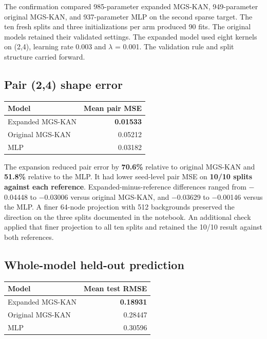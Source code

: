 \documentclass[11pt]{article}
\numberwithin{equation}{section}
\begin{document}
The confirmation compared 985-parameter expanded MGS-KAN, 949-parameter original MGS-KAN, and
937-parameter MLP on the second sparse target. The ten fresh splits and three initializations
per arm produced 90 fits. The original models retained their validated settings. The expanded
model used eight kernels on (2,4), learning rate 0.003 and \ensuremath{\lambda} = 0.001. The
validation rule and split structure carried forward.

\subsection{Pair (2,4) shape error}

\begin{center}
\small
\begin{tabularx}{\linewidth}{@{} Y r @{}}
\toprule
\textbf{Model} & \textbf{Mean pair MSE} \\
\midrule
Expanded MGS-KAN & \textbf{0.01533} \\
Original MGS-KAN & 0.05212 \\
MLP & 0.03182 \\
\bottomrule
\end{tabularx}
\end{center}

The expansion reduced pair error by \textbf{70.6\%} relative to original MGS-KAN and
\textbf{51.8\%} relative to the MLP. It had lower seed-level pair MSE on \textbf{10/10 splits
against each reference}. Expanded-minus-reference differences ranged from
\ensuremath{-}0.04448 to \ensuremath{-}0.03006 versus original MGS-KAN, and
\ensuremath{-}0.03629 to \ensuremath{-}0.00146 versus the MLP. A finer 64-node projection with
512 backgrounds preserved the direction on the three splits documented in the notebook. An
additional check applied that finer projection to all ten splits and retained the 10/10 result
against both references.

\subsection{Whole-model held-out prediction}

\begin{center}
\small
\begin{tabularx}{\linewidth}{@{} Y r @{}}
\toprule
\textbf{Model} & \textbf{Mean test RMSE} \\
\midrule
Expanded MGS-KAN & \textbf{0.18931} \\
Original MGS-KAN & 0.28447 \\
MLP & 0.30596 \\
\bottomrule
\end{tabularx}
\end{center}
\end{document}

